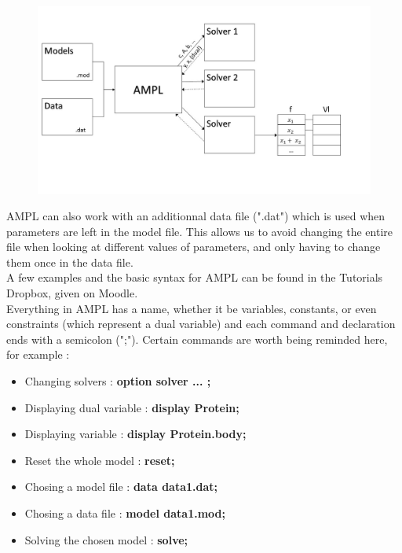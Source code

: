 \begin{figure}[h!]
\centering
\includegraphics[width=\textwidth]{./images/Course1_Slide2.JPG}
\caption{}
\label{Figure2}
\end{figure} 

AMPL can also work with an additionnal data file (".dat") which is used when parameters are left in the model file. This allows us to avoid changing the entire file when looking at different values of parameters, and only having to change them once in the data file. \\

A few examples and the basic syntax for AMPL can be found in the Tutorials Dropbox, given on Moodle. \\

Everything in AMPL has a name, whether it be variables, constants, or even constraints (which represent a dual variable) and each command and declaration ends with a semicolon (";"). 
Certain commands are worth being reminded here, for example : \\

\begin{itemize}
  \item Changing solvers : \textbf{option solver ... ;}
  \item Displaying dual variable : \textbf{display Protein;}
  \item Displaying variable : \textbf{display Protein.body;}
  \item Reset the whole model : \textbf{reset;}
  \item Chosing a model file : \textbf{data data1.dat;}
  \item Chosing a data file : \textbf{model data1.mod;}
  \item Solving the chosen model : \textbf{solve;}
\end{itemize} 




